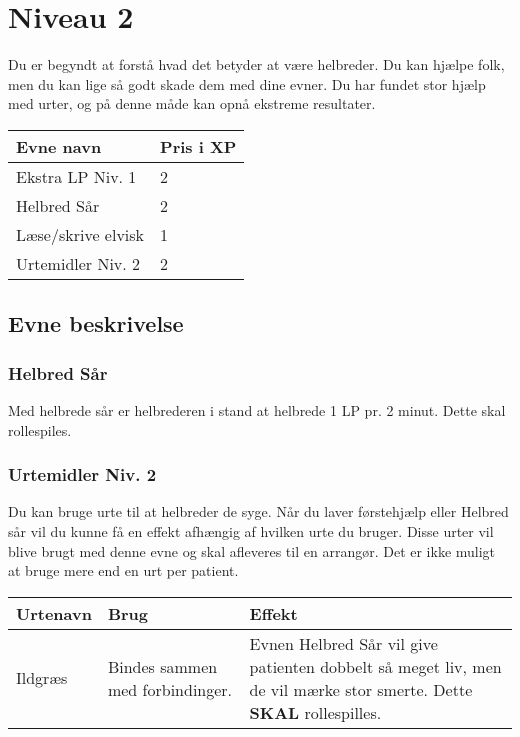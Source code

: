 \chapter*{Niveau 2}
Du er begyndt at forstå hvad det betyder at være helbreder. Du kan hjælpe folk, men du kan lige så godt skade dem med dine evner. Du har fundet stor hjælp med urter, og på denne måde kan opnå ekstreme resultater.
\begin{table}[H]
    \centering
    \begin{tabular}{|p{}|p{}|}
    \rowcolor{cerulean!80}\hline
    Evne navn & Pris i XP \\\hline
    Ekstra LP Niv. 1 & 2\\\hline
    Helbred Sår & 2\\\hline
    Læse/skrive elvisk & 1\\\hline
    Urtemidler Niv. 2 & 2 \\\hline
    \end{tabular}
\end{table}
\section*{Evne beskrivelse}



\subsection*{Helbred Sår}
Med helbrede sår er helbrederen i stand at helbrede 1 LP pr. 2 minut. Dette skal rollespiles.



\subsection*{Urtemidler Niv. 2}

Du kan bruge urte til at helbreder de syge. Når du laver førstehjælp eller Helbred sår vil du kunne få en effekt afhængig af hvilken urte du bruger. Disse urter vil blive brugt med denne evne og skal afleveres til en arrangør. Det er ikke muligt at bruge mere end en urt per patient.
\begin{table}[H]
     \centering
    \begin{tabular}{|p{}|p{}|p{}|}
    \rowcolor{cerulean!80}\hline
        Urtenavn & Brug & Effekt \\\hline
    Ildgræs & Bindes sammen med forbindinger. & Evnen Helbred Sår vil give patienten dobbelt så meget liv, men de vil mærke stor smerte. Dette \textbf{SKAL} rollespilles.\\\hline
    \end{tabular}
\end{table}